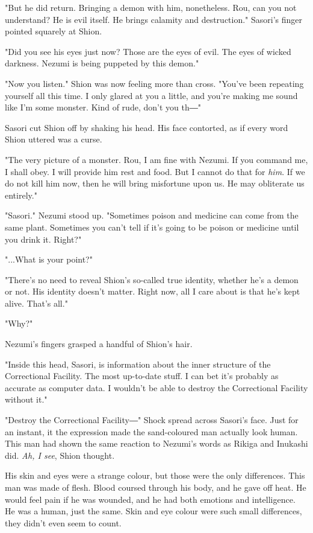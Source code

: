 "But he did return. Bringing a demon with him, nonetheless. Rou, can you
not understand? He is evil itself. He brings calamity and destruction."
Sasori's finger pointed squarely at Shion.

"Did you see his eyes just now? Those are the eyes of evil. The eyes of
wicked darkness. Nezumi is being puppeted by this demon."

"Now you listen." Shion was now feeling more than cross. "You've been
repeating yourself all this time. I only glared at you a little, and
you're making me sound like I'm some monster. Kind of rude, don't you
th―"

Sasori cut Shion off by shaking his head. His face contorted, as if
every word Shion uttered was a curse.

"The very picture of a monster. Rou, I am fine with Nezumi. If you
command me, I shall obey. I will provide him rest and food. But I cannot
do that for \emph{him}. If we do not kill him now, then he will bring
misfortune upon us. He may obliterate us entirely."

"Sasori." Nezumi stood up. "Sometimes poison and medicine can come from
the same plant. Sometimes you can't tell if it's going to be poison or
medicine until you drink it. Right?"

"...What is your point?"

"There's no need to reveal Shion's so-called true identity, whether he's
a demon or not. His identity doesn't matter. Right now, all I care about
is that he's kept alive. That's all."

"Why?"

Nezumi's fingers grasped a handful of Shion's hair.

"Inside this head, Sasori, is information about the inner structure of
the Correctional Facility. The most up-to-date stuff. I can bet it's
probably as accurate as computer data. I wouldn't be able to destroy the
Correctional Facility without it."

"Destroy the Correctional Facility―" Shock spread across Sasori's face.
Just for an instant, it the expression made the sand-coloured man
actually look human. This man had shown the same reaction to Nezumi's
words as Rikiga and Inukashi did. \emph{Ah, I see}, Shion thought.

His skin and eyes were a strange colour, but those were the only
differences. This man was made of flesh. Blood coursed through his body,
and he gave off heat. He would feel pain if he was wounded, and he had
both emotions and intelligence. He was a human, just the same. Skin and
eye colour were such small differences, they didn't even seem to count.

